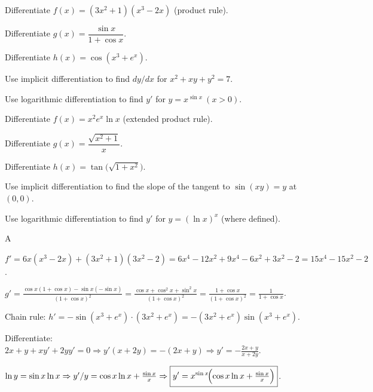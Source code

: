 \documentclass[11pt]{article}
\begin{document}
\begin{problems}
\item Differentiate $f(x) = (3x^2 + 1)(x^3 - 2x)$ (product rule).
\item Differentiate $g(x) = \dfrac{\sin x}{1 + \cos x}$.
\item Differentiate $h(x) = \cos(x^3 + e^x)$.
\item Use implicit differentiation to find $dy/dx$ for $x^2 + xy + y^2 = 7$.
\item Use logarithmic differentiation to find $y'$ for $y = x^{\sin x}\ (x > 0)$.
\end{problems}

\vfill
\newpage
{}
\begin{problems}
\item Differentiate $f(x) = x^2 e^x \ln x$ (extended product rule).
\item Differentiate $g(x) = \dfrac{\sqrt{x^2 + 1}}{x}$.
\item Differentiate $h(x) = \tan\!\bigl(\sqrt{1 + x^2}\bigr)$.
\item Use implicit differentiation to find the slope of the tangent to $\sin(xy) = y$ at $(0, 0)$.
\item Use logarithmic differentiation to find $y'$ for $y = (\ln x)^x$ (where defined).
\end{problems}

\vfill
\newpage
{}

\begin{answers}{A}
\item $f' = 6x(x^3-2x) + (3x^2+1)(3x^2-2) = 6x^4 - 12x^2 + 9x^4 - 6x^2 + 3x^2 - 2 = \boxed{15x^4 - 15x^2 - 2}$.
\item $g' = \tfrac{\cos x(1+\cos x) - \sin x(-\sin x)}{(1+\cos x)^2} = \tfrac{\cos x + \cos^2 x + \sin^2 x}{(1+\cos x)^2} = \tfrac{1 + \cos x}{(1+\cos x)^2} = \boxed{\tfrac{1}{1+\cos x}}$.
\item Chain rule: $h' = -\sin(x^3 + e^x) \cdot (3x^2 + e^x) = \boxed{-(3x^2 + e^x)\sin(x^3 + e^x)}$.
\item Differentiate: $2x + y + x y' + 2y y' = 0 \Rightarrow y'(x + 2y) = -(2x + y) \Rightarrow \boxed{y' = -\tfrac{2x+y}{x+2y}}$.
\item $\ln y = \sin x \ln x \Rightarrow y'/y = \cos x \ln x + \tfrac{\sin x}{x} \Rightarrow \boxed{y' = x^{\sin x}\!\Bigl(\cos x \ln x + \tfrac{\sin x}{x}\Bigr)}$.
\end{answers}
\end{document}
